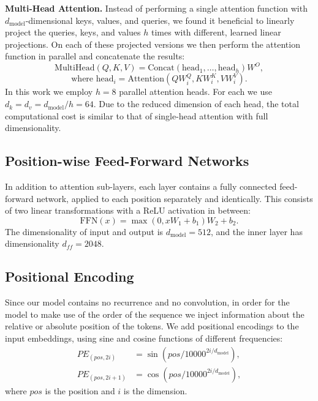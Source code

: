 \documentclass[conference]{IEEEtran}
\begin{document}
\textbf{Multi-Head Attention.} Instead of performing a single attention function
with $d_{\text{model}}$-dimensional keys, values, and queries, we found it
beneficial to linearly project the queries, keys, and values $h$ times with
different, learned linear projections. On each of these projected versions we then
perform the attention function in parallel and concatenate the results:
\begin{equation}
\mathrm{MultiHead}(Q, K, V) = \mathrm{Concat}(\mathrm{head}_1, \dots, \mathrm{head}_h)W^{O},
\label{eq:mha}
\end{equation}
\begin{equation}
\text{where } \mathrm{head}_i = \mathrm{Attention}(QW_i^{Q}, KW_i^{K}, VW_i^{V}).
\end{equation}
In this work we employ $h = 8$ parallel attention heads. For each we use
$d_k = d_v = d_{\text{model}}/h = 64$. Due to the reduced dimension of each head,
the total computational cost is similar to that of single-head attention with full
dimensionality.

\subsection{Position-wise Feed-Forward Networks}
In addition to attention sub-layers, each layer contains a fully connected
feed-forward network, applied to each position separately and identically. This
consists of two linear transformations with a ReLU activation in between:
\begin{equation}
\mathrm{FFN}(x) = \max(0, xW_1 + b_1)W_2 + b_2.
\label{eq:ffn}
\end{equation}
The dimensionality of input and output is $d_{\text{model}} = 512$, and the inner
layer has dimensionality $d_{ff} = 2048$.

\subsection{Positional Encoding}
Since our model contains no recurrence and no convolution, in order for the model
to make use of the order of the sequence we inject information about the relative
or absolute position of the tokens. We add positional encodings to the input
embeddings, using sine and cosine functions of different frequencies:
\begin{align}
PE_{(pos, 2i)}   &= \sin\!\left(pos / 10000^{2i/d_{\text{model}}}\right),\\
PE_{(pos, 2i+1)} &= \cos\!\left(pos / 10000^{2i/d_{\text{model}}}\right),
\end{align}
where $pos$ is the position and $i$ is the dimension.
\end{document}
